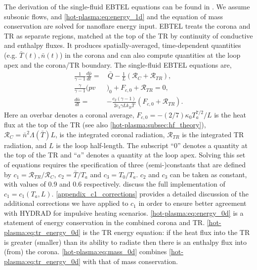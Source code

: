 The derivation of the single-fluid EBTEL equations can be found in \citep{klimchuk_highly_2008,cargill_enthalpy-based_2012}. We assume subsonic flows, and \autoref{hot-plasma:eq:energy_1d} and the equation of mass conservation are solved for nanoflare energy input. EBTEL treats the corona and TR as separate regions, matched at the top of the TR by continuity of conductive and enthalpy fluxes. It produces spatially-averaged, time-dependent quantities (e.g. $\bar{T}(t),\bar{n}(t)$) in the corona and can also compute quantities at the loop apex and the corona/TR boundary. The single-fluid EBTEL equations are,
\begin{align}
    \frac{1}{\gamma - 1}\frac{d\bar{p}}{dt} =& \,\bar{Q} - \frac{1}{L}(\mathcal{R}_C + \mathcal{R}_{TR}), \label{hot-plasma:eq:energy_0d} \\
    \frac{\gamma}{\gamma - 1}(pv&)_0 + F_{c,0} + \mathcal{R}_{TR} = 0, \label{hot-plasma:eq:tr_energy_0d} \\
    \frac{d\bar{n}}{dt} =& -\frac{c_2(\gamma - 1)}{2c_3\gamma Lk_B\bar{T}}(F_{c,0} + \mathcal{R}_{TR}).\label{hot-plasma:eq:mass_0d}
\end{align}
Here an overbar denotes a coronal average, $F_{c,0} = -(2/7)\kappa_0 T_a^{7/2}/L$ is the heat flux at the top of the TR (see also \autoref{hot-plasma:subsec:hf_theory}), $\mathcal{R}_C=\bar{n}^2\Lambda(\bar{T})L$, is the integrated coronal radiation, $\mathcal{R}_{TR}$ is the integrated TR radiation, and $L$ is the loop half-length. The subscript ``0'' denotes a quantity at the top of the TR and ``$a$'' denotes a quantity at the loop apex. Solving this set of equations requires the specification of three (semi-)constants that are defined by  $c_1=\mathcal{R}_{TR}/\mathcal{R}_C$, $c_2=\bar{T}/T_a$ and $c_3=T_0/T_a$. $c_2$ and $c_3$ can be taken as constant, with values of 0.9 and 0.6 respectively. \citet{cargill_enthalpy-based_2012} discuss the full implementation of $c_1 = c_1(T_a,L)$. \autoref{appendix_c1_corrections} provides a detailed discussion of the additional corrections we have applied to $c_1$ in order to ensure better agreement with HYDRAD for impulsive heating scenarios. \autoref{hot-plasma:eq:energy_0d} is a statement of energy conservation in the combined corona and TR. \autoref{hot-plasma:eq:tr_energy_0d} is the TR energy equation: if the heat flux into the TR is greater (smaller) than its ability to radiate then there is an enthalpy flux into (from) the corona. \autoref{hot-plasma:eq:mass_0d} combines \autoref{hot-plasma:eq:tr_energy_0d} with that of mass conservation.

